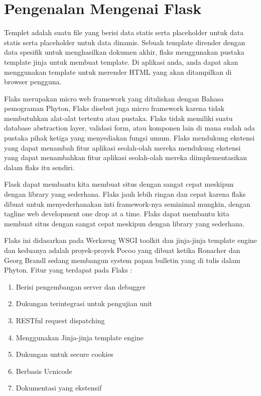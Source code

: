 
\section {Pengenalan Mengenai Flask}
Templet adalah suatu file yang berisi data statis serta placeholder untuk data statis serta placeholder untuk data dinamis. Sebuah 
template dirender dengan data spesifik untuk menghasilkan dokumen akhir, flaks menggunakan pustaka template jinja untuk membuat 
template. Di aplikasi anda, anda dapat akan menggunakan template untuk merender HTML yang akan ditampilkan di browser pengguna.

Flaks merupakan micro web framework yang dituliskan dengan Bahasa pemograman Phyton, Flaks disebut juga micro framework karena tidak 
membutuhkan alat-alat tertentu atau pustaka. Flaks tidak memiliki suatu database abstraction layer, validasi form, atau komponen lain 
di mana sudah ada pustaka pihak ketiga yang menyediakan fungsi umum. Flaks mendukung ekstensi yang dapat menambah fitur aplikasi 
seolah-olah mereka mendukung ekstensi yang dapat menambahkan fitur aplikasi seolah-olah mereka diimplementasikan dalam flaks itu 
sendiri.

Flask dapat membantu kita membuat situs dengan sangat cepat meskipun dengan library yang sederhana. Flaks jauh lebih ringan dan cepat 
karena flaks dibuat untuk menyederhanakan inti framework-nya seminimal mungkin, dengan tagline web development one drop at a time. 
Flaks dapat membantu kita membuat situs dengan sangat cepat meskipun dengan library yang sederhana. 

Flaks ini didasarkan pada Werkzeug WSGI toolkit dan jinja-jinja template engine dan keduanya adalah proyek-proyek Pocoo yang dibuat 
ketika Ronacher dan Georg Brandl sedang membangun system papan bulletin yang di tulis dalam Phyton. Fitur yang terdapat pada Flaks :
\begin{enumerate}
\item Berisi pengembangan server dan debugger
\item Dukungan terintegrasi untuk pengujian unit
\item RESTful request dispatching
\item Menggunakan Jinja-jinja template engine
\item Dukungan untuk secure cookies
\item Berbasis Ucnicode
\item Dokumentasi yang ekstensif
\end{enumerate}


